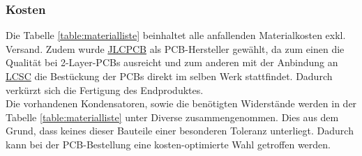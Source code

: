 \documentclass[12pt]{article}
\begin{document}
	\subsubsection{Kosten}
	Die Tabelle \ref{table:materialliste} beinhaltet alle anfallenden Materialkosten exkl. Versand. Zudem wurde \href{https://jlcpcb.com/}{JLCPCB} als PCB-Hersteller gewählt, da zum einen die Qualität bei 2-Layer-PCBs ausreicht und zum anderen mit der Anbindung an \href{https://www.lcsc.com/}{LCSC} die Bestückung der PCBs direkt im selben Werk stattfindet. Dadurch verkürzt sich die Fertigung des Endproduktes. \\
	Die vorhandenen Kondensatoren, sowie die benötigten Widerstände werden in der Tabelle \ref{table:materialliste} unter Diverse zusammengenommen. Dies aus dem Grund, dass keines dieser Bauteile einer besonderen Toleranz unterliegt. Dadurch kann bei der PCB-Bestellung eine kosten-optimierte Wahl getroffen werden.
\end{document}
